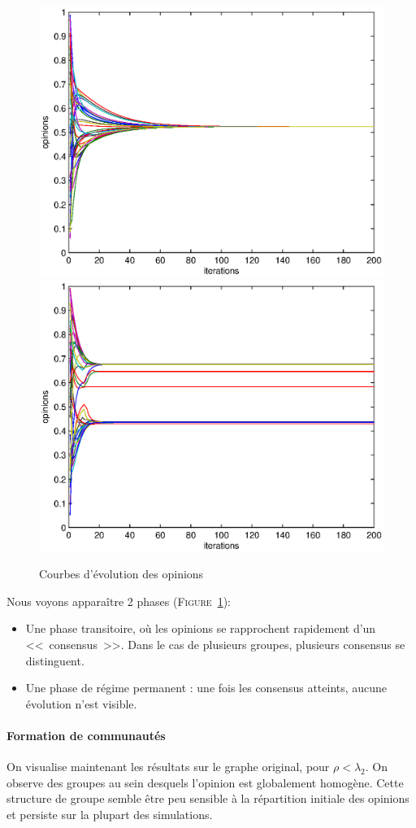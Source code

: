 \documentclass[12pt]{article}
\def\fig#1{\textsc{Figure}~\ref{#1}}
\begin{document}
\begin{figure}[htb]
	\begin{center}
		\includegraphics[width=.4\textwidth]{evolution_ok}
		\includegraphics[width=.4\textwidth]{evolution_clusters}
	\end{center}
	\caption{Courbes d'évolution des opinions}
	\label{fig:evol}
\end{figure}

Nous voyons apparaître 2 phases (\fig{fig:evol}):
\begin{itemize}
	\item Une phase transitoire, où les opinions se rapprochent rapidement d'un <<~consensus~>>.
		Dans le cas de plusieurs groupes, plusieurs consensus se distinguent.
	\item Une phase de régime permanent : une fois les consensus atteints, aucune évolution n'est visible.
\end{itemize}


\paragraph{Formation de communautés}
On visualise maintenant les résultats sur le graphe original, pour
$\rho < \lambda_2$. On observe des groupes au sein desquels l'opinion
est globalement homogène. Cette structure de groupe semble être peu
sensible à la répartition initiale des opinions et persiste
sur la plupart des simulations.
\end{document}

